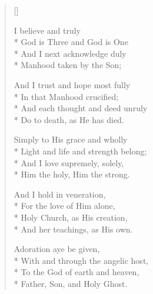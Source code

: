 \newHymn


\begin{verse}[\versewidth]
\begin{altverse}

 I believe and
truly\\*
God is Three and God is One\\*
And I next acknowledge duly\\*
Manhood taken by the Son;
\end{altverse}

\begin{altverse}
 And I trust and hope most fully\\*
In that Manhood crucified;\\*
And each thought and deed unruly\\*
Do to death, as He has died.
\end{altverse}

\begin{altverse}
Simply to His grace and wholly\\*
Light and life and strength belong;\\*
And I love supremely, solely,\\*
Him the holy, Him the strong.
\end{altverse}

\begin{altverse}
And I hold in veneration,\\*
For the love of Him alone,\\*
Holy Church, as His creation,\\*
And her teachings, as His own.
\end{altverse}

\begin{altverse}
Adoration aye be given,\\*
With and through the angelic host,\\*
To the God of earth and heaven,\\*
Father, Son, and Holy Ghost.

\end{altverse}
\end{verse}

